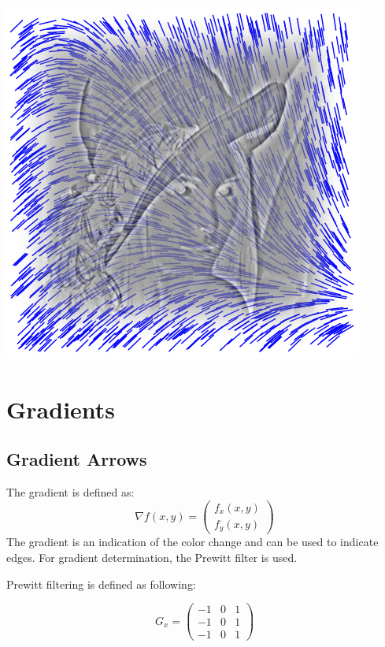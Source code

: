 \documentclass[a4paper,12px]{article}
\begin{document}
\vspace{2cm}
\begin{center}
    \includegraphics[width=(\textwidth/6*5)]{front}
\end{center}
\clearpage

\tableofcontents
\vspace{5mm}

\captionsetup{width=\textwidth/7*5}


\section{Gradients}
\subsection{Gradient Arrows}

The gradient is defined as:
$$\nabla f(x,y)=\!\!\left(\begin{array}{c} f_x(x,y) \\
f_y(x,y)\end{array}\right)$$
The gradient is an indication of the color change and can be used to indicate
edges. For gradient determination, the Prewitt filter is used.

Prewitt filtering is defined as following:

$$ G_x = \left(\begin{array}{ccc} -1 & 0 & 1 \\ -1 & 0 & 1 \\ -1 & 0 & 1
\end{array}\right)$$
\end{document}
